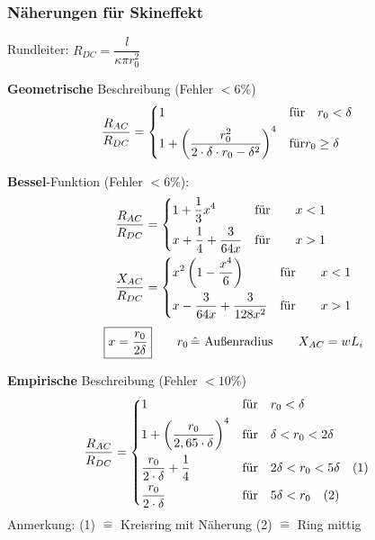 \subsubsection{Näherungen für Skineffekt}
Rundleiter: $ R_{DC} = \dfrac{l}{\kappa \pi r_0^2}$
\begin{description}
	\item \textbf{Geometrische} Beschreibung (Fehler $ < 6\% $)
	  	\begin{align*}
		\frac{R_{AC}}{R_{DC}} & =
		\begin{dcases}
			1 & \text{für} \quad r_0 < \delta \\
			1+ \left( \frac{r_0^2}{2\cdot \delta \cdot r_0 - \delta^2} \right)^4  & \text{für} r_0 \geq \delta
		\end{dcases}
	\end{align*}
	
    \item \textbf{Bessel}-Funktion (Fehler $ < 6 \% $):
          \begin{align*}
              \frac{R_{AC}}{R_{DC}} & =
              \begin{dcases}
                  1 + \frac{1}{3}x^4              & \text{für} \qquad x < 1 \\
                  x + \frac{1}{4} + \frac{3}{64x} & \text{für} \qquad x > 1 \\
              \end{dcases} \\
              \frac{X_{AC}}{R_{DC}} & =
              \begin{dcases}
                  x^2\left( 1-\frac{x^4}{6} \right)   & \text{für} \qquad x < 1 \\
                  x- \frac{3}{64x} + \frac{3}{128x^2} & \text{für} \qquad x > 1 \\
              \end{dcases}
          \end{align*}
          \[
              \boxed{x=\frac{r_0}{2\delta}} \qquad r_0 \, \hat{=} \textnormal{ Außenradius} \qquad X_{AC} = wL_i
          \]
          
  	\item \textbf{Empirische} Beschreibung (Fehler $ < 10\% $)
  	\begin{align*}
  	\frac{R_{AC}}{R_{DC}} & =
  		\begin{dcases}
  			1               & \text{für} \quad r_0 < \delta \\
  			1+ \left( \frac{r_0}{2,65\cdot \delta} \right)^4  & \text{für} \quad \delta < r_0 < 2\delta \\
  			\frac{r_0}{2 \cdot\delta} + \frac{1}{4} & \text{für} \quad 2\delta < r_0 < 5\delta \quad (1) \\
  			\frac{r_0}{2\cdot \delta} & \text{für} \quad 5\delta < r_0 \quad (2)
  		\end{dcases}
  	\end{align*}
 \footnotesize Anmerkung: (1) $\widehat{=}$ Kreisring mit Näherung \quad (2) $\widehat{=}$ Ring mittig
\end{description}

